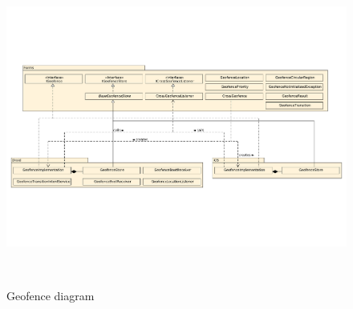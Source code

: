 \documentclass[12pt]{article}
\begin{document}
  
  \begin{figure}[ht]
  	
  	\begin{center}
  		\includegraphics[width=0.9\paperwidth,keepaspectratio=true]{../../../img/GeofenceDiagram.pdf}
  		\caption{Geofence diagram}\label{geofence}\
  	\end{center}
  \end{figure}
\end{document}
